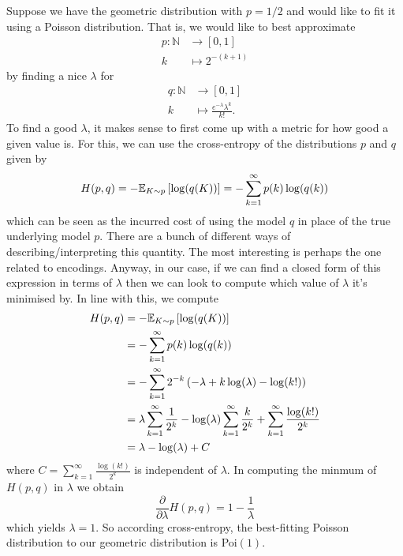 \documentclass[11pt]{article}
\begin{document}
\begin{appendices}
Suppose we have the geometric distribution with $p=1/2$ and would like to fit it using a Poisson distribution. That is, we would like to best approximate
\begin{align*}
    p:\mathbb{N}&\to[0,1]\\
    k&\mapsto2^{-(k+1)}
\end{align*}
by finding a nice $\lambda$ for
\begin{align*}
    q:\mathbb{N}&\to[0,1]\\
    k&\mapsto\frac{e^{-\lambda}\lambda^k}{k!}.
\end{align*}
To find a good $\lambda$, it makes sense to first come up with a metric for how good a given value is. For this, we can use the cross-entropy of the distributions $p$ and $q$ given by
$$
H(p,q)
=
-\mathbb{E}_{K\sim p}\left[\log(q(K))\right]
=
-\sum_{k=1}^{\infty}p(k)\log(q(k))
$$
which can be seen as the incurred cost of using the model $q$ in place of the true underlying model $p$. There are a bunch of different ways of describing/interpreting this quantity. The most interesting is perhaps the one related to encodings. Anyway, in our case, if we can find a closed form of this expression in terms of $\lambda$ then we can look to compute which value of $\lambda$ it's minimised by. In line with this, we compute
\begin{align*}
    H(p,q)
    &=
    -\mathbb{E}_{K\sim p}\left[\log(q(K))\right]\\
    &=
    -\sum_{k=1}^{\infty}p(k)\log(q(k))\\
    &=
    -\sum_{k=1}^{\infty}2^{-k}\left(-\lambda+k\log(\lambda)-\log(k!)\right)\\
    &=
    \lambda\sum_{k=1}^{\infty}\frac{1}{2^k}-\log(\lambda)\sum_{k=1}^{\infty}\frac{k}{2^k}+\sum_{k=1}^{\infty}\frac{\log(k!)}{2^k}\\
    &=
    \lambda-\log(\lambda)+C
\end{align*}
where $C=\sum_{k=1}^{\infty}\frac{\log(k!)}{2^k}$ is independent of $\lambda$. In computing the minmum of $H(p,q)$ in $\lambda$ we obtain
$$
\frac{\partial}{\partial \lambda}H(p,q)
=
1-\frac{1}{\lambda}
$$
which yields $\lambda=1$. So according cross-entropy, the best-fitting Poisson distribution to our geometric distribution is Poi$(1)$.


\end{appendices}
\end{document}

